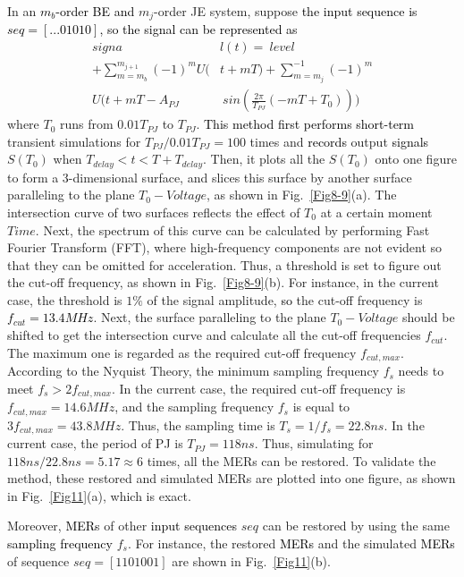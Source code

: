 \documentclass[conference]{IEEEtran}
\begin{document}
In an \textcolor{black}{$m_b$-order BE and} $m_j$-order JE system, suppose \textcolor{black}{the input sequence is $seq=[...01010]$, so the signal can be represented as}
\begin{equation}
\begin{split}
signa&l(t)=\ level\\
+\sum_{m=m_b}^{m_{j+1}}(-1)^mU(&t+mT)+\sum_{m=m_j}^{-1}(-1)^m\\
U(t+mT-A_{PJ}&\ sin(\frac{2\pi}{T_{PJ}}(-mT+T_0)))
\end{split}
\label{eq8}
\end{equation}
where $T_0$ runs from $0.01T_{PJ}$ to $T_{PJ}$. \textcolor{black}{This method first performs short-term} transient simulations for $T_{PJ}/0.01T_{PJ}=100$ times and \textcolor{black}{records} output \textcolor{black}{signals} $S(T_0)$ when $T_{delay}<t<T+T_{delay}$.
\color{black}
Then, it plots all the $S(T_0)$ onto one figure to form a 3-dimensional surface, and slices this surface by another surface paralleling to the plane $T_0-Voltage$, as shown in Fig.~\ref{Fig8-9}(a). The intersection curve of two surfaces reflects the effect of $T_0$ at a certain moment $Time$. Next, the spectrum of this curve can be calculated by performing Fast Fourier Transform (FFT), where high-frequency components are not evident so that they can be omitted for acceleration. Thus, a threshold is set to figure out the cut-off frequency, as shown in Fig.~\ref{Fig8-9}(b).
\color{black}
For instance, in the current case, the threshold is $1\%$ of the signal amplitude, \textcolor{black}{so} the cut-off frequency is \textcolor{black}{$f_{cut}=13.4MHz$}.
\color{black}
Next, the surface paralleling to the plane $T_0-Voltage$ should be shifted to get the intersection curve and calculate all the cut-off frequencies $f_{cut}$. The maximum one is regarded as the required cut-off frequency $f_{cut,max}$. According to the Nyquist Theory, the minimum sampling frequency $f_s$ needs to meet $f_s>2f_{cut,max}$. In the current case, the required cut-off frequency is $f_{cut,max}=14.6MHz$, and the sampling frequency $f_s$ is equal to $3f_{cut,max}=43.8MHz$. Thus, the sampling time is $T_s=1/f_s=22.8ns$. In the current case, the period of PJ is $T_{PJ}=118ns$. Thus, simulating for $118ns/22.8ns=5.17\approx6$ times, all the MERs can be restored. To validate the method, these restored and simulated MERs are plotted into one figure, as shown in Fig.~\ref{Fig11}(a), which is exact.
\color{black}

Moreover, \textcolor{black}{MERs} of other \textcolor{black}{input sequences} $seq$ can be restored by using the same \textcolor{black}{sampling frequency} $f_s$. For instance, the restored \textcolor{black}{MERs} and the simulated \textcolor{black}{MERs} of sequence $seq=[1101001]$ are shown in Fig.~\ref{Fig11}(b).
\end{document}
